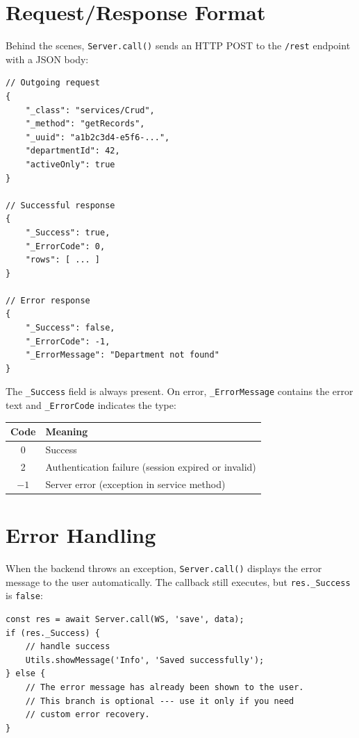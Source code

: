 \section{Request/Response Format}
\label{sec:sc-format}

Behind the scenes, \texttt{Server.call()} sends an HTTP POST to the \texttt{/rest} endpoint with a JSON body:

\begin{lstlisting}[style=javascript]
// Outgoing request
{
    "_class": "services/Crud",
    "_method": "getRecords",
    "_uuid": "a1b2c3d4-e5f6-...",
    "departmentId": 42,
    "activeOnly": true
}

// Successful response
{
    "_Success": true,
    "_ErrorCode": 0,
    "rows": [ ... ]
}

// Error response
{
    "_Success": false,
    "_ErrorCode": -1,
    "_ErrorMessage": "Department not found"
}
\end{lstlisting}

\noindent
The \texttt{\_Success} field is always present.  On error, \texttt{\_ErrorMessage} contains the error text and \texttt{\_ErrorCode} indicates the type:

\begin{longtable}{cl}
\toprule
\textbf{Code} & \textbf{Meaning} \\
\midrule
\endhead
0 & Success \\
2 & Authentication failure (session expired or invalid) \\
$-1$ & Server error (exception in service method) \\
\bottomrule
\end{longtable}

\section{Error Handling}
\label{sec:sc-errors}

When the backend throws an exception, \texttt{Server.call()} displays the error message to the user automatically.  The callback still executes, but \texttt{res.\_Success} is \texttt{false}:

\begin{lstlisting}[style=javascript]
const res = await Server.call(WS, 'save', data);
if (res._Success) {
    // handle success
    Utils.showMessage('Info', 'Saved successfully');
} else {
    // The error message has already been shown to the user.
    // This branch is optional --- use it only if you need
    // custom error recovery.
}
\end{lstlisting}

